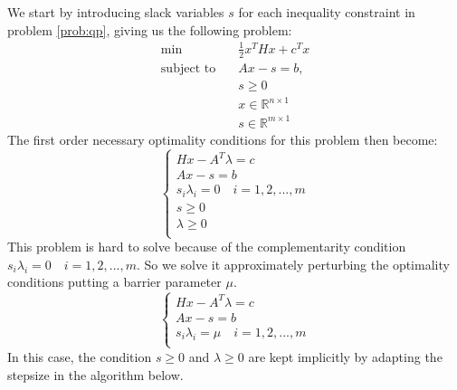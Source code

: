 \documentclass{article}
\begin{document}
We start by introducing slack variables $s$ for each inequality constraint in problem \ref{prob:qp}, giving us the following problem:
\begin{equation*} 
\begin{aligned}
\textrm{min} \quad        & \frac{1}{2} x^T H x + c^T x \\
\textrm{subject to} \quad & A x  - s = b,  \\
                          & s \geq 0 \\
                          & x \in \mathbb{R}^{n \times 1} \\
                          & s \in \mathbb{R}^{m \times 1}
\end{aligned}
\end{equation*}
The first order necessary optimality conditions for this problem then become:
\begin{equation*}
\begin{cases}
Hx-A^T\lambda=c\\
Ax-s=b\\
s_i \lambda_i=0 \quad i=1,2,...,m \\
s \ge 0 \\
\lambda \ge 0 \\
\end{cases}
\end{equation*}
%
This problem is hard to solve because of the complementarity condition $s_i \lambda_i=0 \quad i=1,2,...,m $. So we solve it approximately perturbing the optimality conditions putting a barrier parameter $\mu$.
%
\begin{equation*}
\begin{cases}
Hx-A^T\lambda=c\\
Ax-s=b\\
s_i \lambda_i=\mu \quad i=1,2,...,m \\
\end{cases}
\end{equation*}
In this case, the condition $s \geq 0$ and $\lambda \geq 0$ are kept implicitly by adapting the stepsize in the algorithm below.
\end{document}
